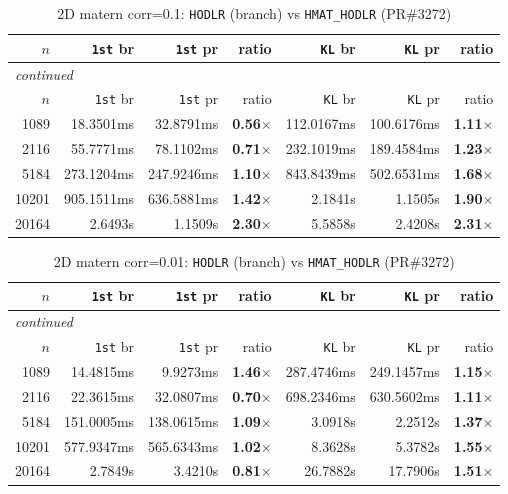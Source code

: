 \documentclass[11pt,a4paper]{article}
\begin{document}
\small\begin{center}
\begin{longtable}{rrrrrrr}
\caption{2D matern corr=0.1: \texttt{HODLR} (branch) vs \texttt{HMAT\_HODLR} (PR\#3272)}
\\\toprule
$n$ & \texttt{1st} br & \texttt{1st} pr & ratio & \texttt{KL} br & \texttt{KL} pr & ratio\\
\midrule
\endfirsthead
\multicolumn{7}{l}{\small\emph{continued}}\\
\toprule
$n$ & \texttt{1st} br & \texttt{1st} pr & ratio & \texttt{KL} br & \texttt{KL} pr & ratio\\
\midrule
\endhead

1089 & 18.3501ms & 32.8791ms & \textbf{0.56$\times$} & 112.0167ms & 100.6176ms & \textbf{1.11$\times$}\\
2116 & 55.7771ms & 78.1102ms & \textbf{0.71$\times$} & 232.1019ms & 189.4584ms & \textbf{1.23$\times$}\\
5184 & 273.1204ms & 247.9246ms & \textbf{1.10$\times$} & 843.8439ms & 502.6531ms & \textbf{1.68$\times$}\\
10201 & 905.1511ms & 636.5881ms & \textbf{1.42$\times$} & 2.1841s & 1.1505s & \textbf{1.90$\times$}\\
20164 & 2.6493s & 1.1509s & \textbf{2.30$\times$} & 5.5858s & 2.4208s & \textbf{2.31$\times$}\\
\bottomrule\end{longtable}\end{center}
\small\begin{center}
\begin{longtable}{rrrrrrr}
\caption{2D matern corr=0.01: \texttt{HODLR} (branch) vs \texttt{HMAT\_HODLR} (PR\#3272)}
\\\toprule
$n$ & \texttt{1st} br & \texttt{1st} pr & ratio & \texttt{KL} br & \texttt{KL} pr & ratio\\
\midrule
\endfirsthead
\multicolumn{7}{l}{\small\emph{continued}}\\
\toprule
$n$ & \texttt{1st} br & \texttt{1st} pr & ratio & \texttt{KL} br & \texttt{KL} pr & ratio\\
\midrule
\endhead

1089 & 14.4815ms & 9.9273ms & \textbf{1.46$\times$} & 287.4746ms & 249.1457ms & \textbf{1.15$\times$}\\
2116 & 22.3615ms & 32.0807ms & \textbf{0.70$\times$} & 698.2346ms & 630.5602ms & \textbf{1.11$\times$}\\
5184 & 151.0005ms & 138.0615ms & \textbf{1.09$\times$} & 3.0918s & 2.2512s & \textbf{1.37$\times$}\\
10201 & 577.9347ms & 565.6343ms & \textbf{1.02$\times$} & 8.3628s & 5.3782s & \textbf{1.55$\times$}\\
20164 & 2.7849s & 3.4210s & \textbf{0.81$\times$} & 26.7882s & 17.7906s & \textbf{1.51$\times$}\\
\bottomrule\end{longtable}\end{center}
\end{document}
